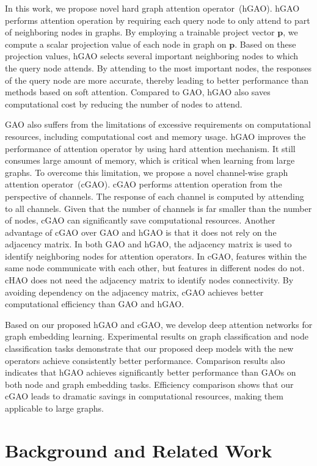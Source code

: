 \documentclass[sigconf]{acmart}
\begin{document}
In this work, we propose novel hard graph attention operator~(hGAO).
hGAO performs attention operation by requiring each query node to
only attend to part of neighboring nodes in graphs. By employing a
trainable project vector $\boldsymbol p$, we compute a scalar
projection value of each node in graph on $\boldsymbol p$. Based on
these projection values, hGAO selects several important neighboring
nodes to which the query node attends. By attending to the most
important nodes, the responses of the query node are more accurate,
thereby leading to better performance than methods based on soft
attention. Compared to GAO, hGAO also saves computational cost by
reducing the number of nodes to attend.


GAO also suffers from the limitations of excessive requirements on
computational resources, including computational cost and memory
usage. hGAO improves the performance of attention operator by using
hard attention mechanism. It still consumes large amount of memory,
which is critical when learning from large graphs. To overcome this
limitation, we propose a novel channel-wise graph attention
operator~(cGAO). cGAO performs attention operation from the
perspective of channels. The response of each channel is computed by
attending to all channels. Given that the number of channels is far
smaller than the number of nodes, cGAO can significantly save
computational resources. Another advantage of cGAO over GAO and hGAO
is that it does not rely on the adjacency matrix. In both GAO and
hGAO, the adjacency matrix is used to identify neighboring nodes for
attention operators. In cGAO, features within the same node
communicate with each other, but features in different nodes do not.
cHAO does not need the adjacency matrix to identify nodes
connectivity. By avoiding dependency on the adjacency matrix, cGAO
achieves better computational efficiency than GAO and hGAO.

Based on our proposed hGAO and cGAO, we develop deep attention
networks for graph embedding learning. Experimental results on graph
classification and node classification tasks demonstrate that our
proposed deep models with the new operators achieve consistently
better performance. Comparison results also indicates that hGAO
achieves significantly better performance than GAOs on both node and
graph embedding tasks. Efficiency comparison shows that our cGAO
leads to dramatic savings in computational resources, making them
applicable to large graphs.


\section{Background and Related Work}\label{sec:relatedwork}
\end{document}
